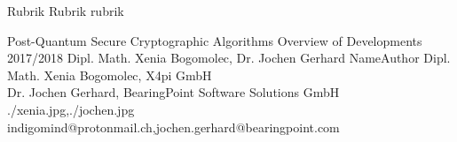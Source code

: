 \documentclass[a4paper,11pt]{article}
\begin{document}
\setcounter{footnote}{0}
\setcounter{figure}{0}


\Abschnitt
{Rubrik}
{Rubrik}
{rubrik}

\vspace{3mm}


\Aufsatz
{Post-Quantum Secure Cryptographic Algorithms}
{Overview of Developments 2017/2018}
{Dipl. Math. Xenia Bogomolec, Dr. Jochen Gerhard}
{NameAuthor}
{Dipl. Math. Xenia Bogomolec, X4pi GmbH\\ Dr. Jochen Gerhard, BearingPoint Software Solutions GmbH}
{./xenia.jpg,./jochen.jpg}
{indigomind@protonmail.ch,jochen.gerhard@bearingpoint.com}
\end{document}
